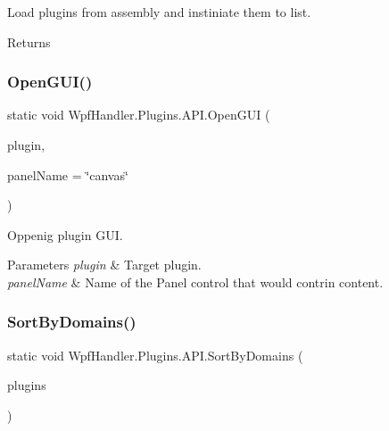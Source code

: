 Load plugins from assembly and instiniate them to list. 

\begin{DoxyReturn}{Returns}

\end{DoxyReturn}
\mbox{\label{class_wpf_handler_1_1_plugins_1_1_a_p_i_a4dbfd1cc62cfb8def6f17d8c622e0fd8}} 
\subsubsection{\texorpdfstring{Open\+G\+U\+I()}{OpenGUI()}}
{\footnotesize\ttfamily static void Wpf\+Handler.\+Plugins.\+A\+P\+I.\+Open\+G\+UI (\begin{DoxyParamCaption}\item[{\mbox{\hyperlink{interface_wpf_handler_1_1_plugins_1_1_i_plugin}{I\+Plugin}}}]{plugin,  }\item[{string}]{panel\+Name = {\ttfamily \char`\"{}canvas\char`\"{}} }\end{DoxyParamCaption})\hspace{0.3cm}{\ttfamily [static]}}



Oppenig plugin G\+UI. 


\begin{DoxyParams}{Parameters}
{\em plugin} & Target plugin.\\
\hline
{\em panel\+Name} & Name of the Panel control that would contrin content.\\
\hline
\end{DoxyParams}
\mbox{\label{class_wpf_handler_1_1_plugins_1_1_a_p_i_aaa094e4b6d27c336e8f0f76acc04ba20}} 
\subsubsection{\texorpdfstring{Sort\+By\+Domains()}{SortByDomains()}}
{\footnotesize\ttfamily static void Wpf\+Handler.\+Plugins.\+A\+P\+I.\+Sort\+By\+Domains (\begin{DoxyParamCaption}\item[{I\+Collection$<$ \mbox{\hyperlink{interface_wpf_handler_1_1_plugins_1_1_i_plugin}{I\+Plugin}} $>$}]{plugins }\end{DoxyParamCaption})\hspace{0.3cm}{\ttfamily [static]}}



